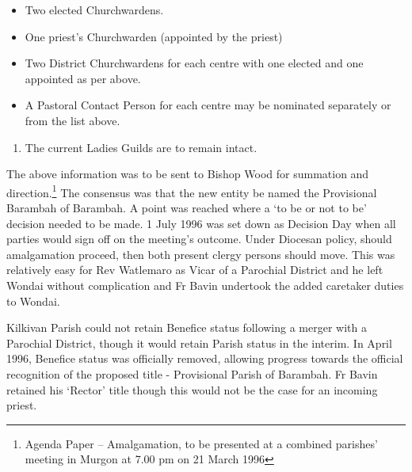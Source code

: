 \begin{itemize}

\item

  Two elected Churchwardens.

\item

  One priest's Churchwarden (appointed by the priest)

\item

  Two District Churchwardens for each centre with one elected and one appointed as per above.

\item

  A Pastoral Contact Person for each centre may be nominated separately or from the list above.

\end{itemize}



\begin{enumerate}

\def\labelenumi{\arabic{enumi}.}

\setcounter{enumi}{5}

\item

  The current Ladies Guilds are to remain intact.

\end{enumerate}



\smallskip


The above information was to be sent to Bishop Wood for summation and direction.\footnote{Agenda Paper -- Amalgamation, to be presented at a combined parishes' meeting in Murgon at 7.00 pm on 21 March 1996} The consensus was that the new entity be named the Provisional Barambah of Barambah. A point was reached where a `to be or not to be' decision needed to be made. 1 July 1996 was set down as Decision Day when all parties would sign off on the meeting's outcome. Under Diocesan policy, should amalgamation proceed, then both present clergy persons should move. This was relatively easy for Rev Watlemaro as Vicar of a Parochial District and he left Wondai without complication and Fr Bavin undertook the added caretaker duties to Wondai.


Kilkivan Parish could not retain Benefice status following a merger with a Parochial District, though it would retain Parish status in the interim. In April 1996, Benefice status was officially removed, allowing progress towards the official recognition of the proposed title - Provisional Parish of Barambah. Fr Bavin retained his `Rector' title though this would not be the case for an incoming priest.



